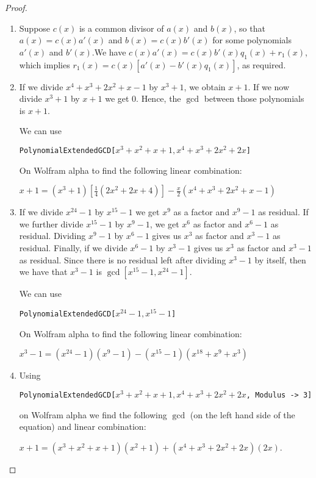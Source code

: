 \begin{proof}
 \begin{enumerate}
     \item Suppose $c(x)$ is a common divisor of $a(x)$ and $b(x)$, so that $a(x)=c(x)a'(x)$ and $b(x)=c(x)b'(x)$ for some polynomials $a'(x)$ and $b'(x)$.We have $c(x)a'(x)=c(x)b'(x)q_1(x)+r_1(x)$, which implies $r_1(x)=c(x)[a'(x)-b'(x)q_1(x)]$, as required.
     \item If we divide $x^4+x^3+2x^2+x-1$ by $x^3+1$, we obtain $x+1$. If we now divide $x^3+1$ by $x+1$ we get $0$. Hence, the $\gcd$ between those polynomials is $x+1$.

     We can use 

     \texttt{PolynomialExtendedGCD[$x^3+x^2+x+1, x^4+x^3+2x^2+2x$]}

     On Wolfram alpha to find the following linear combination:

     $x+1 = (x^3+1)[\frac{1}{4}(2x^2+2x+4)]-\frac{x}{2}(x^4+x^3+2x^2+x-1)$
     \item If we divide $x^{24}-1$ by $x^{15}-1$ we get $x^9$ as a factor and $x^9-1$ as residual. If we further divide $x^15-1$ by $x^9-1$, we get $x^6$ as factor and $x^6-1$ as residual. Dividing $x^9-1$ by $x^6-1$ gives us $x^3$ as factor and $x^3-1$ as residual. Finally, if we divide $x^6-1$ by $x^3-1$ gives us $x^3$ as factor and $x^3-1$ as residual. Since there is no residual left after dividing $x^3-1$ by itself, then we have that $x^3-1$ is $\gcd[x^{15}-1, x^{24}-1]$.

     We can use 

     \texttt{PolynomialExtendedGCD[$x^{24}-1, x^{15}-1$]}

     On Wolfram alpha to find the following linear combination:

     $x^3-1 = (x^{24}-1)(x^9-1)-(x^{15}-1)(x^{18}+x^9+x^3)$

     \item Using 
     
     \texttt{PolynomialExtendedGCD[$x^3+x^2+x+1, x^4+x^3+2x^2+2x$, Modulus -> 3]} 
     
     on Wolfram alpha we find the following $\gcd$ (on the left hand side of the equation) and linear combination: 
     
     $x+1 = (x^3+x^2+x+1)(x^2+1) + (x^4+x^3+2x^2+2x)(2x)$.
 \end{enumerate}
\end{proof}